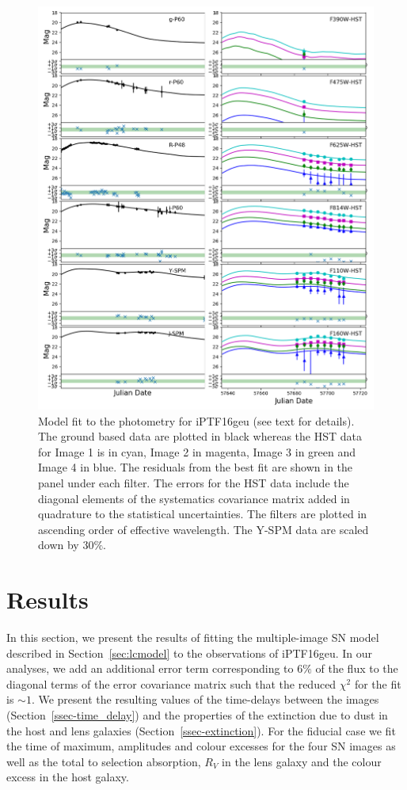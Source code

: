 \documentclass[a4paper,fleqn,usenatbib]{mnras}
\begin{document}
\begin{figure}
    \centering
    \includegraphics[width=.9\textwidth]{16geu_lcfit_magscale.png}
    \caption{Model fit to the photometry for iPTF16geu (see text for details). The ground based data are plotted in black whereas the HST data for Image 1 is in cyan, Image 2 in magenta, Image 3 in green and Image 4 in blue. The residuals from the best fit are shown in the panel under each filter. The errors for the HST data include the diagonal elements of the systematics covariance matrix added in quadrature to the statistical uncertainties. The filters are plotted in ascending order of effective wavelength. The Y-SPM data are scaled down by 30$\%$.}
    \label{fig:16geu_lc}
\end{figure}

\section{Results}
\label{sec:results}
In this section, we present the results of fitting the multiple-image SN model described in Section~\ref{sec:lcmodel} to the observations of iPTF16geu. In our analyses, we add an additional error term corresponding to 6$\%$ of the flux to the diagonal terms of the error covariance matrix such that the reduced $\chi^2$ for the fit is $\sim 1$. 
 We present the resulting values of the time-delays between the images (Section~\ref{ssec-time_delay}) and the properties of the extinction due to dust in the host and lens galaxies (Section~\ref{ssec-extinction}). For the fiducial case we fit the time of maximum, amplitudes and colour excesses for the four SN images as well as the total to selection absorption, $R_V$ in the lens galaxy and the colour excess in the host galaxy. 
\end{document}
